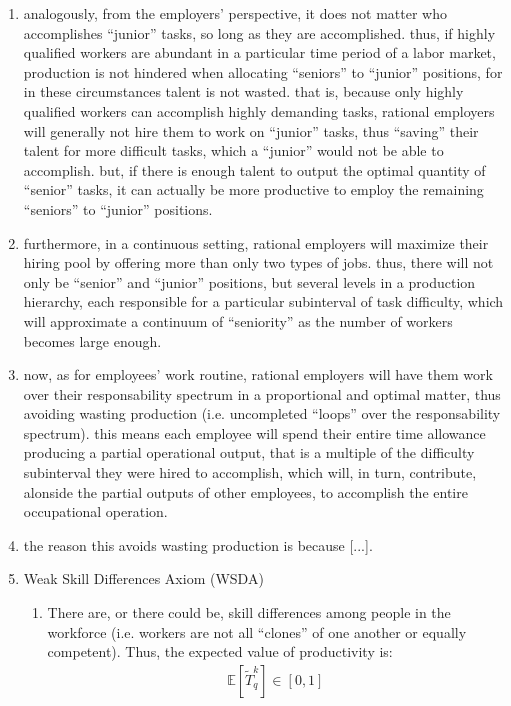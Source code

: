 \documentclass[hidelinks, nonatbib]{elsarticle}
\begin{document}
\begin{enumerate}
    \item analogously, from the employers' perspective, it does not matter who accomplishes ``junior'' tasks, so long as they are accomplished. thus, if highly qualified workers are abundant in a particular time period of a labor market, production is not hindered when allocating ``seniors'' to ``junior'' positions, for in these circumstances talent is not wasted. that is, because only highly qualified workers can accomplish highly demanding tasks, rational employers will generally not hire them to work on ``junior'' tasks, thus ``saving'' their talent for more difficult tasks, which a ``junior'' would not be able to accomplish. but, if there is enough talent to output the optimal quantity of ``senior'' tasks, it can actually be more productive to employ the remaining ``seniors'' to ``junior'' positions.
    \item furthermore, in a continuous setting, rational employers will maximize their hiring pool by offering more than only two types of jobs. thus, there will not only be ``senior'' and ``junior'' positions, but several levels in a production hierarchy, each responsible for a particular subinterval of task difficulty, which will approximate a continuum of ``seniority'' as the number of workers becomes large enough.
    \item now, as for employees' work routine, rational employers will have them work over their responsability spectrum in a proportional and optimal matter, thus avoiding wasting production (i.e. uncompleted ``loops'' over the responsability spectrum). this means each employee will spend their entire time allowance producing a partial operational output, that is a multiple of the difficulty subinterval they were hired to accomplish, which will, in turn, contribute, alonside the partial outputs of other employees, to accomplish the entire occupational operation.
    \item the reason this avoids wasting production is because [...].
    \item Weak Skill Differences Axiom (WSDA)
    \begin{enumerate}
        \item There are, or there could be, skill differences among people in the workforce (i.e. workers are not all ``clones'' of one another or equally competent). Thus, the expected value of productivity is:
        \begin{gather}
            \mathbb{E}[
                \tilde{T}_{q}^{k}
            ]
            \in
            [0,1]

\end{gather}
\end{enumerate}
\end{enumerate}
\end{document}
